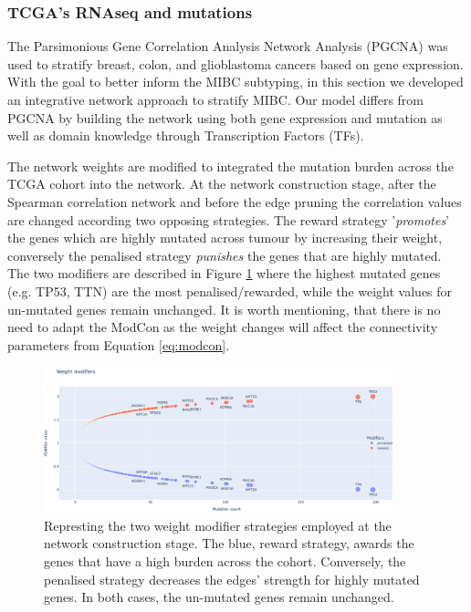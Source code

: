 \subsubsection{TCGA's RNAseq and mutations}


The Parsimonious Gene Correlation Analysis Network Analysis (PGCNA) was used to stratify breast, colon, and glioblastoma cancers \cite{Care2019-ij,Tanner2023-wa} based on gene expression. With the goal to better inform the MIBC subtyping, in this section we developed an integrative network approach to stratify MIBC. Our model differs from PGCNA by building the network using both gene expression and mutation as well as  domain knowledge through Transcription Factors (TFs).

The network weights are modified to integrated the mutation burden across the TCGA cohort into the network. At the network construction stage, after the Spearman correlation network and before the edge pruning the correlation values are changed according two opposing strategies. The reward strategy '\textit{promotes}' the genes which are highly mutated across tumour by increasing their weight, conversely the penalised strategy \textit{punishes} the genes that are highly mutated. The two modifiers are described in Figure \ref{fig:N_I:modifiers} where the highest mutated genes (e.g. TP53, TTN) are the most penalised/rewarded, while the weight values for un-mutated genes remain unchanged. It is worth mentioning, that there is no need to adapt the ModCon as the weight changes will affect the connectivity parameters from Equation \ref{eq:modcon}.

\begin{figure}[!htb]    \centering\includegraphics[width=0.9\textwidth,height=0.9\textheight,keepaspectratio]{Sections/Network_I/Resources/Methods/modifiers.png}
    \caption{Represting the two weight modifier strategies employed at the network construction stage. The blue, reward strategy, awards the genes that have a high burden across the cohort. Conversely, the  penalised strategy decreases the edges' strength for highly mutated genes. In both cases, the un-mutated genes remain unchanged.}
    \label{fig:N_I:modifiers}
\end{figure}


